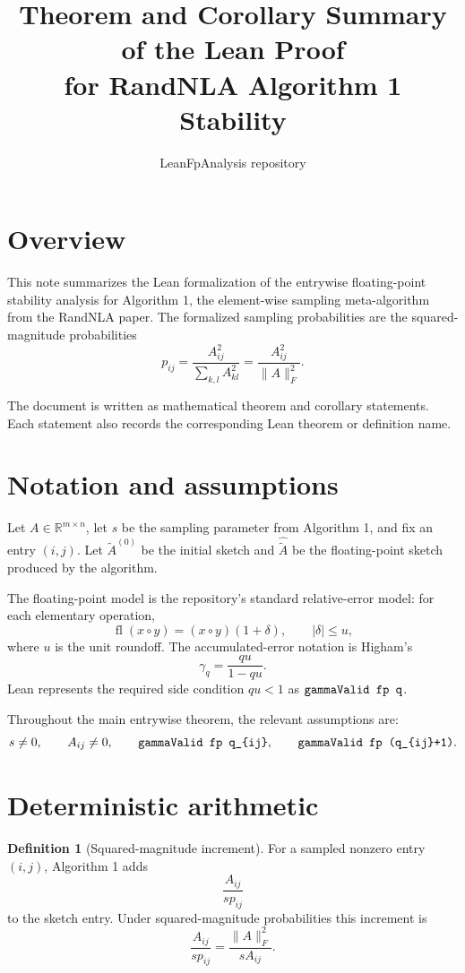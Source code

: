 \documentclass[11pt]{article}
\title{Theorem and Corollary Summary of the Lean Proof\\
for RandNLA Algorithm 1 Stability}
\author{LeanFpAnalysis repository}
\date{}
\newcommand{\fl}{\operatorname{fl}}
\newcommand{\Frob}[1]{\lVert #1\rVert_F}
\newcommand{\R}{\mathbb{R}}
\newcommand{\lean}[1]{\texttt{\detokenize{#1}}}
\theoremstyle{definition}
\newtheorem{definition}[theorem]{Definition}
\theoremstyle{remark}
\begin{document}
\sloppy
\maketitle

\section*{Overview}

This note summarizes the Lean formalization of the entrywise floating-point
stability analysis for Algorithm 1, the element-wise sampling meta-algorithm
from the RandNLA paper. The formalized sampling probabilities are the
squared-magnitude probabilities
\[
  p_{ij} =
  \frac{A_{ij}^2}{\sum_{k,l} A_{kl}^2}
  =
  \frac{A_{ij}^2}{\Frob{A}^2}.
\]

The document is written as mathematical theorem and corollary statements. Each
statement also records the corresponding Lean theorem or definition name.

\section*{Notation and assumptions}

Let \(A \in \R^{m \times n}\), let \(s\) be the sampling parameter from
Algorithm 1, and fix an entry \((i,j)\). Let
\(\widetilde A^{(0)}\) be the initial sketch and
\(\widehat{\widetilde A}\) be the floating-point sketch produced by the
algorithm.

The floating-point model is the repository's standard relative-error model:
for each elementary operation,
\[
  \fl(x \circ y) = (x \circ y)(1+\delta),
  \qquad |\delta| \le u,
\]
where \(u\) is the unit roundoff. The accumulated-error notation is Higham's
\[
  \gamma_q = \frac{q u}{1-q u}.
\]
Lean represents the required side condition \(q u < 1\) as
\(\lean{gammaValid fp q}\).

Throughout the main entrywise theorem, the relevant assumptions are:
\[
  s \ne 0,
  \qquad
  A_{ij} \ne 0,
  \qquad
  \lean{gammaValid fp q_{ij}},
  \qquad
  \lean{gammaValid fp (q_{ij}+1)}.
\]

\section*{Deterministic arithmetic}

\begin{definition}[Squared-magnitude increment]
For a sampled nonzero entry \((i,j)\), Algorithm 1 adds
\[
  \frac{A_{ij}}{s p_{ij}}
\]
to the sketch entry. Under squared-magnitude probabilities this increment is
\[
  \frac{A_{ij}}{s p_{ij}}
  =
  \frac{\Frob{A}^2}{s A_{ij}}.
\]
\end{definition}
\end{document}
